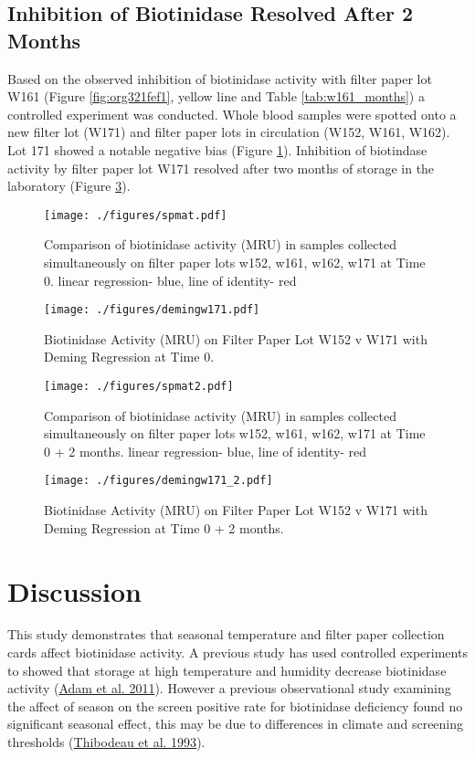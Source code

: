 \documentclass[review]{elsarticle}
\begin{document}
\subsection*{Inhibition of Biotinidase Resolved After 2 Months}
\label{sec:orgd2b3160}
Based on the observed inhibition of biotinidase activity with filter
paper lot W161 (Figure \ref{fig:org321fef1}, yellow line and Table
\ref{tab:w161_months}) a controlled experiment was conducted. Whole
blood samples were spotted onto a new filter lot (W171) and filter
paper lots in circulation (W152, W161, W162). Lot 171 showed a notable
negative bias (Figure \ref{fig:orga9eed72}). Inhibition of biotindase activity by
filter paper lot W171 resolved after two months of storage in the
laboratory (Figure \ref{fig:org13533e3}).

\begin{figure}[htbp]
\centering
\texttt{[image: ./figures/spmat.pdf]}
\caption{\label{fig:orga9eed72}Comparison of biotinidase activity (MRU) in samples collected simultaneously on filter paper lots w152, w161, w162, w171 at Time 0. linear regression- blue, line of identity- red}
\end{figure}

\begin{figure}[htbp]
\centering
\texttt{[image: ./figures/demingw171.pdf]}
\caption{\label{fig:orgf5bbff8}Biotinidase Activity (MRU) on Filter Paper Lot W152 v W171 with Deming Regression at Time 0.}
\end{figure}
\clearpage

\begin{figure}[htbp]
\centering
\texttt{[image: ./figures/spmat2.pdf]}
\caption{\label{fig:org13533e3}Comparison of biotinidase activity (MRU) in samples collected simultaneously on filter paper lots w152, w161, w162, w171 at Time 0 + 2 months. linear regression- blue, line of identity- red}
\end{figure}

\begin{figure}[htbp]
\centering
\texttt{[image: ./figures/demingw171\_2.pdf]}
\caption{\label{fig:org141fd8c}Biotinidase Activity (MRU) on Filter Paper Lot W152 v W171 with Deming Regression at Time 0 + 2 months.}
\end{figure}

\clearpage


\section*{Discussion}
\label{sec:org9058b39}
This study demonstrates that seasonal temperature and filter paper
collection cards affect biotinidase activity. A previous study has
used controlled experiments to showed that storage at high temperature
and humidity decrease biotinidase activity (\hyperlink{citeproc_bib_item_1}{Adam et al. 2011}). However a
previous observational study examining the affect of season on the
screen positive rate for biotinidase deficiency found no significant
seasonal effect, this may be due to differences in climate and
screening thresholds (\hyperlink{citeproc_bib_item_9}{Thibodeau et al. 1993}).
\end{document}
